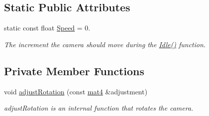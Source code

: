 \subsection*{\-Static \-Public \-Attributes}
\begin{DoxyCompactItemize}
\item 
static const float \hyperlink{class_camera_aedf8ba8b2af631a5a3e33b19bfa40322}{\-Speed} = 0.
\begin{DoxyCompactList}\small\item\em \-The increment the camera should move during the \hyperlink{class_camera_aec3559fe43597656629fdb00157d3c73}{\-Idle()} function. \end{DoxyCompactList}\end{DoxyCompactItemize}
\subsection*{\-Private \-Member \-Functions}
\begin{DoxyCompactItemize}
\item 
void \hyperlink{class_camera_a7ffc3619f9a5d8e586cb3d96ebdd3188}{adjust\-Rotation} (const \hyperlink{class_angel_1_1mat4}{mat4} \&adjustment)
\begin{DoxyCompactList}\small\item\em adjust\-Rotation is an internal function that rotates the camera. \end{DoxyCompactList}\end{DoxyCompactItemize}

